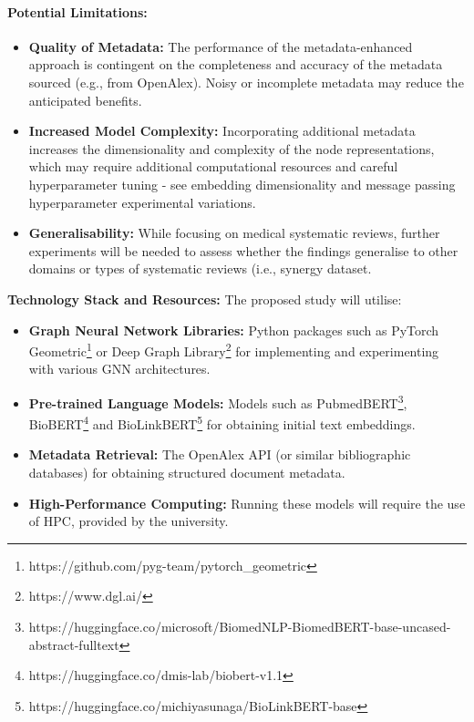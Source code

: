 \documentclass[10pt,oneside]{book}
\begin{document}
\paragraph{Potential Limitations:}
\begin{itemize} 

\item \textbf{Quality of Metadata:} The performance of the metadata-enhanced approach is contingent on the completeness and accuracy of the metadata sourced (e.g., from OpenAlex). Noisy or incomplete metadata may reduce the anticipated benefits. 

\item \textbf{Increased Model Complexity:} Incorporating additional metadata increases the dimensionality and complexity of the node representations, which may require additional computational resources and careful hyperparameter tuning - see embedding dimensionality and message passing hyperparameter experimental variations. 
\item \textbf{Generalisability:} While focusing on medical systematic reviews, further experiments will be needed to assess whether the findings generalise to other domains or types of systematic reviews (i.e., synergy dataset. 

\end{itemize}

\textbf{Technology Stack and Resources:}
The proposed study will utilise: \begin{itemize} \item \textbf{Graph Neural Network Libraries:} Python packages such as PyTorch Geometric\footnote{https://github.com/pyg-team/pytorch\_geometric} or Deep Graph Library\footnote{https://www.dgl.ai/} for implementing and experimenting with various GNN architectures. \item \textbf{Pre-trained Language Models:} Models such as PubmedBERT\footnote{https://huggingface.co/microsoft/BiomedNLP-BiomedBERT-base-uncased-abstract-fulltext}, BioBERT\footnote{https://huggingface.co/dmis-lab/biobert-v1.1} and BioLinkBERT\footnote{https://huggingface.co/michiyasunaga/BioLinkBERT-base} for obtaining initial text embeddings. \item \textbf{Metadata Retrieval:} The OpenAlex API (or similar bibliographic databases) for obtaining structured document metadata. 
\item \textbf{High-Performance Computing: } Running these models will require the use of HPC, provided by the university.
\end{itemize}
\end{document}
